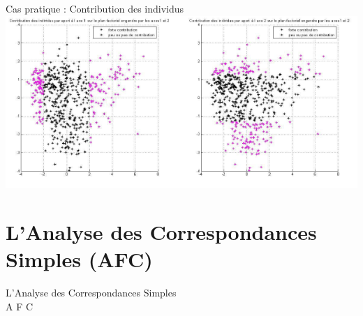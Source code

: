 \documentclass[11pt]{beamer}
\begin{document}
\begin{frame}{ Cas pratique :  Contribution des individus}
\centering 
\includegraphics[scale=0.6]{CNL6} 

\end{frame}





\section{L'Analyse des Correspondances Simples (AFC)}
\begin{frame}
\centering
 \begin{Large}
 
 
L'Analyse des Correspondances Simples  \\



A F C
\end{Large}





\end{frame}



\end{document}
